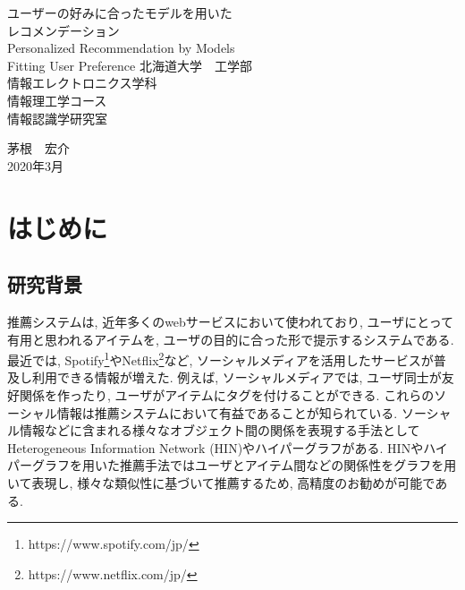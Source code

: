 \documentclass[a4j,11pt]{jarticle}           %
\begin{document}
	\begin{titlepage}
		\setcounter{page}{0}
		\begin{center}
			\vspace*{2.0cm}
			\LARGE
			ユーザーの好みに合ったモデルを用いた\\レコメンデーション\\
			\vfill
			Personalized Recommendation by Models \\Fitting User Preference
			\vfill
			\LARGE
			北海道大学　工学部\\
			情報エレクトロニクス学科\\
			情報理工学コース\\
			情報認識学研究室
			
			\vspace{2ex}
			茅根　宏介\\
			\vspace{2ex}
			2020年3月\\
			\vspace*{2cm}
		\end{center}
	\end{titlepage}
	\tableofcontents \thispagestyle{empty}
	\newpage
	\listoffigures
	
	\listoftables
	\clearpage 
	\pagestyle{plain} 
	
	
	\section{はじめに}
	\subsection{研究背景}
	推薦システムは, 近年多くのwebサービスにおいて使われており, ユーザにとって有用と思われるアイテムを, ユーザの目的に合った形で提示するシステムである\cite{rec1, rec2, rec3}. 最近では, Spotify\footnote{https://www.spotify.com/jp/}やNetflix\footnote{https://www.netflix.com/jp/}など, ソーシャルメディアを活用したサービスが普及し利用できる情報が増えた. 例えば, ソーシャルメディアでは, ユーザ同士が友好関係を作ったり, ユーザがアイテムにタグを付けることができる. これらのソーシャル情報は推薦システムにおいて有益であることが知られている\cite{social,tag}. ソーシャル情報などに含まれる様々なオブジェクト間の関係を表現する手法としてHeterogeneous Information Network (HIN)\cite{HIN}やハイパーグラフ\cite{hyper}がある. HINやハイパーグラフを用いた推薦手法ではユーザとアイテム間などの関係性をグラフを用いて表現し, 様々な類似性に基づいて推薦するため, 高精度のお勧めが可能である.
	
\end{document}
